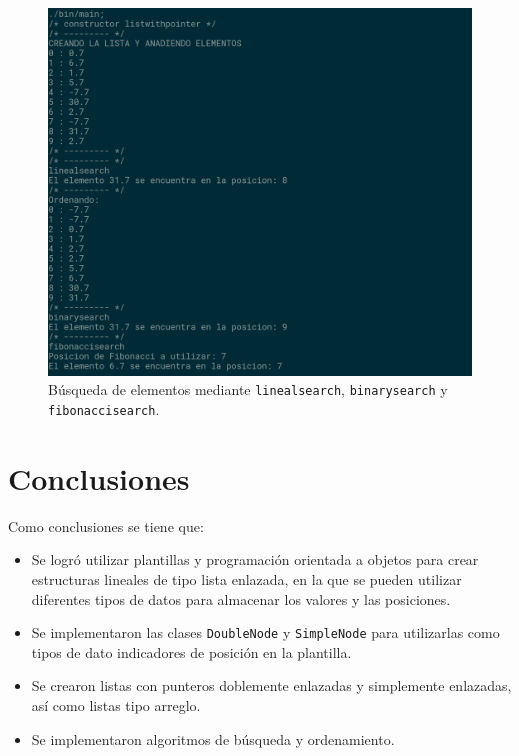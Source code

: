 \begin{figure}[H]
\centering
\includegraphics[width=\textwidth]{imgs/Labo7/busq.png}
\caption{Búsqueda de elementos mediante \texttt{linealsearch}, \texttt{binarysearch} y \texttt{fibonaccisearch}.}
\label{fig:busq}
\end{figure}



\section{Conclusiones}


Como conclusiones se tiene que:

\begin{itemize}
\item Se logró utilizar plantillas y programación orientada a objetos para crear estructuras lineales de tipo lista enlazada, en la que se pueden utilizar diferentes tipos de datos para almacenar los valores y las posiciones.
\item Se implementaron las clases \texttt{DoubleNode} y \texttt{SimpleNode} para utilizarlas como tipos de dato indicadores de posición en la plantilla.
\item Se crearon listas con punteros doblemente enlazadas y simplemente enlazadas, así como listas tipo arreglo. 
\item Se implementaron algoritmos de búsqueda y ordenamiento.

\end{itemize}


